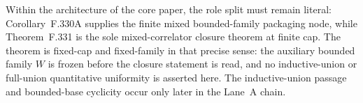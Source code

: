 
\begin{remark}
Within the architecture of the core paper, the role split must remain literal: Corollary~F.330A supplies the finite mixed bounded-family packaging node, while Theorem~F.331 is the sole mixed-correlator closure theorem at finite cap. The theorem is fixed-cap and fixed-family in that precise sense: the auxiliary bounded family $W$ is frozen before the closure statement is read, and no inductive-union or full-union quantitative uniformity is asserted here. The inductive-union passage and bounded-base cyclicity occur only later in the Lane~A chain.
\end{remark}
